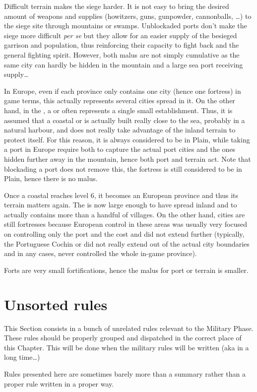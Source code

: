 \begin{designnote}
  Difficult terrain makes the siege harder. It is not easy to bring the
  desired amount of weapons and supplies (howitzers, guns, gunpowder,
  cannonballs, \ldots) to the siege site through mountains or
  swamps. Unblockaded ports don't make the siege more difficult \emph{per se}
  but they allow for an easier supply of the besieged garrison and population,
  thus reinforcing their capacity to fight back and the general fighting
  spirit. However, both malus are not simply cumulative as the same city can
  hardly be hidden in the mountain and a large sea port receiving supply\ldots

  \smallskip

  In Europe, even if each province only contains one city (hence one fortress)
  in game terms, this actually represents several cities spread in it. On the
  other hand, in the \ROTW, a \COL or \TP often represents a single small
  establishment. Thus, it is assumed that a coastal \COL or \TP is actually
  built really close to the sea, probably in a natural harbour, and does not
  really take advantage of the inland terrain to protect itself. For this
  reason, it is always considered to be in Plain, while taking a port in
  Europe require both to capture the actual port cities and the ones hidden
  further away in the mountain, hence both port and terrain act. Note that
  blockading a \ROTW port does not remove this, the fortress is still
  considered to be in Plain, hence there is no malus.

  Once a coastal \COL reaches level 6, it becomes an European province and
  thus its terrain matters again. The \COL is now large enough to have spread
  inland and to actually contains more than a handful of villages. On the
  other hand, \ROTW cities are still \ROTW fortresses because European control
  in these areas was usually very focused on controlling only the port and the
  cost and did not extend further (typically, the Portuguese Cochin or
   did not really extend out of the actual city boundaries
  and in any cases, never controlled the whole in-game province).

  Forts are very small fortifications, hence the malus for port or terrain is
  smaller.
\end{designnote}

\section{Unsorted rules}
\begin{designnote}
  This Section consists in a bunch of unrelated rules relevant to the Military
  Phase. These rules should be properly grouped and dispatched in the correct
  place of this Chapter. This will be done when the military rules will be
  written (aka in a long time\ldots)

  Rules presented here are sometimes barely more than a summary rather than a
  proper rule written in a proper way.
\end{designnote}

